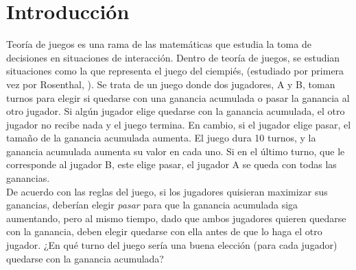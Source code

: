 
\chapter{Introducción} %

\label{Cap_Intro} %


\newcommand{\keyword}[1]{\textbf{#1}}
\newcommand{\tabhead}[1]{\textbf{#1}}
\newcommand{\code}[1]{\texttt{#1}}
\newcommand{\file}[1]{\texttt{\bfseries#1}}
\newcommand{\option}[1]{\texttt{\itshape#1}}


Teoría de juegos es una rama de las matemáticas que estudia la toma de decisiones en situaciones de interacción. Dentro de teoría de juegos, se estudian situaciones como la que representa el juego del ciempiés, (estudiado por primera vez por Rosenthal, \parencite*{Rosenthal1982}). Se trata de un juego donde dos jugadores, A y B, toman turnos para elegir si quedarse con una ganancia acumulada o pasar la ganancia al otro jugador. Si algún jugador elige quedarse con la ganancia acumulada, el otro jugador no recibe nada y el juego termina. En cambio, si el jugador elige pasar, el tamaño de la ganancia acumulada aumenta. El juego dura 10 turnos, y la ganancia acumulada aumenta su valor en cada uno. Si en el último turno, que le corresponde al jugador B, este elige pasar, el jugador A se queda con todas las ganancias.\\

De acuerdo con las reglas del juego, si los jugadores quisieran maximizar sus ganancias, deberían elegir \textit{pasar} para que la ganancia acumulada siga aumentando, pero al mismo tiempo, dado que ambos jugadores quieren quedarse con la ganancia, deben elegir quedarse con ella antes de que lo haga el otro jugador. ¿En qué turno del juego sería una buena elección (para cada jugador) quedarse con la ganancia acumulada?\\

